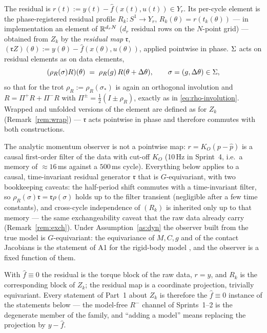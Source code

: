 \begin{definition}
\label{def:residual-element}
The residual is $r(t) := y(t) - \hat f(x(t), u(t)) \in Y_r$. Its per-cycle
element is the phase-registered residual profile
$R_k : S^1 \to Y_r$, $R_k(\theta) = r(t_k(\theta))$ --- in implementation an
element of $\mathbb{R}^{d_r N}$ ($d_r$ residual rows on the $N$-point grid) ---
obtained from $Z_k$ by the \emph{residual map} $\mathfrak{r}$,
$(\mathfrak{r} Z)(\theta) := y(\theta) - \hat f(x(\theta), u(\theta))$,
applied pointwise in phase. $\Sigma$ acts on residual elements as on data
elements,
\begin{equation}
  \label{eq:res-action}
  (\rho_R(\sigma) R)(\theta) \;=\; \rho_{R}(g)\, R(\theta + \Delta\theta),
  \qquad \sigma = (g,\Delta\theta) \in \Sigma,
\end{equation}
so that for the trot $\rho_R := \rho_R(\sigma_*)$ is again an orthogonal
involution and $R = \Pi^{+}R + \Pi^{-}R$ with $\Pi^{\pm} = \tfrac12(I \pm
\rho_R)$, exactly as in \eqref{eq:rho-involution}. Wrapped and unfolded
versions of the element are defined as for $Z_k$ (Remark~\ref{rem:wrap}) ---
$\mathfrak{r}$ acts pointwise in phase and therefore commutes with both
constructions.
\end{definition}

\begin{remark}
\label{rem:causal}
The analytic momentum observer is not a pointwise map: $r = K_O(p - \hat p)$
is a causal first-order filter of the data with cut-off $K_O$ (10\,Hz in
Sprint~4, i.e.\ a memory of $\approx 16$\,ms against a $500$\,ms cycle).
Everything below applies to a causal, time-invariant residual generator
$\mathfrak{r}$ that is $G$-equivariant, with two bookkeeping caveats: the
half-period shift commutes with a time-invariant filter, so
$\rho_R(\sigma)\mathfrak{r} = \mathfrak{r}\rho(\sigma)$ holds up to the
filter transient (negligible after a few time constants), and cross-cycle
independence of $(R_k)$ is inherited only up to that memory --- the same
exchangeability caveat that the raw data already carry
(Remark~\ref{rem:exch}). Under Assumption~\ref{as:dyn} the observer built
from the true model is $G$-equivariant: the equivariance of $M, C, g$ and of
the contact Jacobians is the statement of A1 for the rigid-body model
\cite{ordonez2025morphological}, and the observer is a fixed function of
them.
\end{remark}

\begin{remark}
\label{rem:model-free}
With $\hat f \equiv 0$ the residual is the torque block of the raw data,
$r = y$, and $R_k$ is the corresponding block of $Z_k$; the residual map is
a coordinate projection, trivially equivariant. Every statement of Part~1
about $Z_k$ is therefore the $\hat f \equiv 0$ instance of the statements
below --- the model-free $R^{-}$ channel of Sprints~1--2 is the degenerate
member of the family, and ``adding a model'' means replacing the projection
by $y - \hat f$.
\end{remark}

